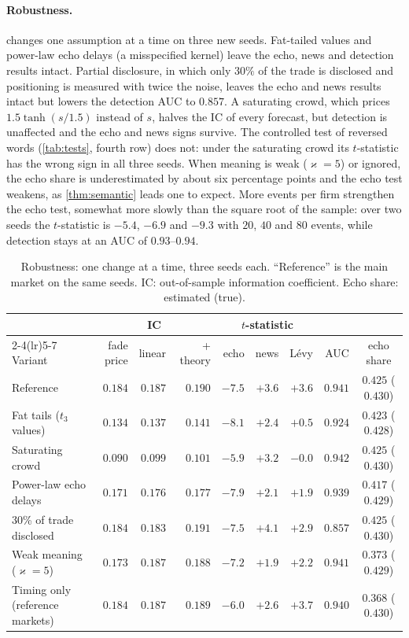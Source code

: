 \documentclass[11pt,a4paper]{article}
\theoremstyle{plain}
\theoremstyle{definition}
\theoremstyle{remark}
\begin{document}
\paragraph{Robustness.}  changes one assumption at a time on three new seeds. Fat-tailed values and power-law echo delays (a misspecified kernel) leave the echo, news and detection results intact. Partial disclosure, in which only $30\%$ of the trade is disclosed and positioning is measured with twice the noise, leaves the echo and news results intact but lowers the detection AUC to $0.857$. A saturating crowd, which prices $1.5\tanh(s/1.5)$ instead of $s$, halves the IC of every forecast, but detection is unaffected and the echo and news signs survive. The controlled test of reversed words (\cref{tab:tests}, fourth row) does not: under the saturating crowd its $t$-statistic has the wrong sign in all three seeds. When meaning is weak ($\varkappa=5$) or ignored, the echo share is underestimated by about six percentage points and the echo test weakens, as \cref{thm:semantic} leads one to expect. More events per firm strengthen the echo test, somewhat more slowly than the square root of the sample: over two seeds the $t$-statistic is $-5.4$, $-6.9$ and $-9.3$ with $20$, $40$ and $80$ events, while detection stays at an AUC of $0.93$--$0.94$.

\begin{table}[ht]
\centering
\caption{Robustness: one change at a time, three seeds each. ``Reference'' is the main market on the same seeds. IC: out-of-sample information coefficient. Echo share: estimated (true).}
\label{tab:robust}
\small
\setlength{\tabcolsep}{3.6pt}
\begin{tabular}{@{}lrrrrrrrc@{}}
\toprule
& \multicolumn{3}{c}{IC} & \multicolumn{3}{c}{$t$-statistic} & & \\
\cmidrule(lr){2-4}\cmidrule(lr){5-7}
Variant & fade price & linear & + theory & echo & news & L\'evy & AUC & echo share \\
\midrule
Reference & $0.184$ & $0.187$ & $0.190$ & $-7.5$ & $+3.6$ & $+3.6$ & $0.941$ & $0.425$ ($0.430$) \\
Fat tails ($t_3$ values) & $0.134$ & $0.137$ & $0.141$ & $-8.1$ & $+2.4$ & $+0.5$ & $0.924$ & $0.423$ ($0.428$) \\
Saturating crowd & $0.090$ & $0.099$ & $0.101$ & $-5.9$ & $+3.2$ & $-0.0$ & $0.942$ & $0.425$ ($0.430$) \\
Power-law echo delays & $0.171$ & $0.176$ & $0.177$ & $-7.9$ & $+2.1$ & $+1.9$ & $0.939$ & $0.417$ ($0.429$) \\
30\% of trade disclosed & $0.184$ & $0.183$ & $0.191$ & $-7.5$ & $+4.1$ & $+2.9$ & $0.857$ & $0.425$ ($0.430$) \\
Weak meaning ($\varkappa=5$) & $0.173$ & $0.187$ & $0.188$ & $-7.2$ & $+1.9$ & $+2.2$ & $0.941$ & $0.373$ ($0.429$) \\
Timing only (reference markets) & $0.184$ & $0.187$ & $0.189$ & $-6.0$ & $+2.6$ & $+3.7$ & $0.940$ & $0.368$ ($0.430$) \\
\bottomrule
\end{tabular}
\end{table}
\end{document}
